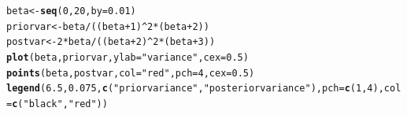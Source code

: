 \documentclass[12pt]{article}\usepackage[]{graphicx}\usepackage[]{color}
\makeatletter
\newcommand{\hlnum}[1]{\textcolor[rgb]{0.686,0.059,0.569}{#1}}%
\newcommand{\hlstr}[1]{\textcolor[rgb]{0.192,0.494,0.8}{#1}}%
\newcommand{\hlopt}[1]{\textcolor[rgb]{0,0,0}{#1}}%
\newcommand{\hlstd}[1]{\textcolor[rgb]{0.345,0.345,0.345}{#1}}%
\newcommand{\hlkwb}[1]{\textcolor[rgb]{0.69,0.353,0.396}{#1}}%
\newcommand{\hlkwc}[1]{\textcolor[rgb]{0.333,0.667,0.333}{#1}}%
\newcommand{\hlkwd}[1]{\textcolor[rgb]{0.737,0.353,0.396}{\textbf{#1}}}%
\newenvironment{kframe}{%
 \def\at@end@of@kframe{}%
 \ifinner\ifhmode%
  \def\at@end@of@kframe{\end{minipage}}%
  \begin{minipage}{\columnwidth}%
 \fi\fi%
 \def\FrameCommand##1{\hskip\@totalleftmargin \hskip-\fboxsep
 \colorbox{shadecolor}{##1}\hskip-\fboxsep
     \hskip-\linewidth \hskip-\@totalleftmargin \hskip\columnwidth}%
 \MakeFramed {\advance\hsize-\width
   \@totalleftmargin\z@ \linewidth\hsize
   \@setminipage}}%
 {\par\unskip\endMakeFramed%
 \at@end@of@kframe}
\newenvironment{knitrout}{}{} %
\makeatother
\begin{document}
\begin{knitrout}\footnotesize
{}\color{fgcolor}\begin{kframe}
\begin{alltt}
\hlstd{beta} \hlkwb{<-} \hlkwd{seq}\hlstd{(}\hlnum{0}\hlstd{,}\hlnum{20}\hlstd{,} \hlkwc{by}\hlstd{=}\hlnum{0.01}\hlstd{)}
\hlstd{priorvar} \hlkwb{<-} \hlstd{beta}\hlopt{/}\hlstd{((beta}\hlopt{+}\hlnum{1}\hlstd{)}\hlopt{^}\hlnum{2}\hlopt{*}\hlstd{(beta}\hlopt{+}\hlnum{2}\hlstd{))}
\hlstd{postvar} \hlkwb{<-} \hlnum{2}\hlopt{*}\hlstd{beta}\hlopt{/}\hlstd{((beta}\hlopt{+}\hlnum{2}\hlstd{)}\hlopt{^}\hlnum{2}\hlopt{*}\hlstd{(beta}\hlopt{+}\hlnum{3}\hlstd{))}
\hlkwd{plot}\hlstd{(beta, priorvar,} \hlkwc{ylab}\hlstd{=}\hlstr{"variance"}\hlstd{,} \hlkwc{cex}\hlstd{=}\hlnum{0.5}\hlstd{)}
\hlkwd{points}\hlstd{(beta, postvar,} \hlkwc{col}\hlstd{=}\hlstr{"red"}\hlstd{,} \hlkwc{pch}\hlstd{=}\hlnum{4}\hlstd{,} \hlkwc{cex}\hlstd{=}\hlnum{0.5}\hlstd{)}
\hlkwd{legend}\hlstd{(}\hlnum{6.5}\hlstd{,}\hlnum{0.075}\hlstd{,} \hlkwd{c}\hlstd{(}\hlstr{"prior variance"}\hlstd{,} \hlstr{"posterior variance"}\hlstd{),} \hlkwc{pch}\hlstd{=}\hlkwd{c}\hlstd{(}\hlnum{1}\hlstd{,}\hlnum{4}\hlstd{),} \hlkwc{col}\hlstd{=}\hlkwd{c}\hlstd{(}\hlstr{"black"}\hlstd{,} \hlstr{"red"}\hlstd{))}
\end{alltt}
\end{kframe}
\end{knitrout}
\end{document}
